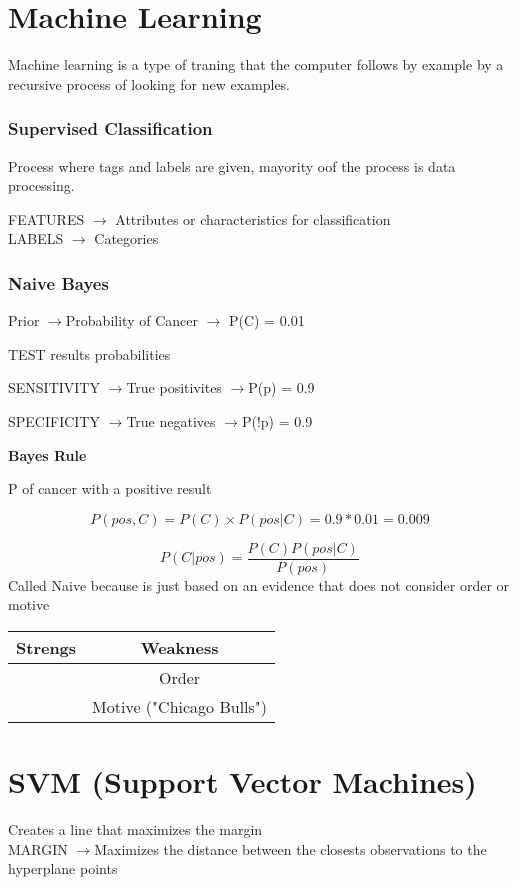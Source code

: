 \documentclass{article}
\newcommand{\ra}{$\longrightarrow$}
\begin{document}
\section{Machine Learning} %
\label{sec:Machine Learning}
Machine learning is a type of traning that the computer follows by example by a
recursive process of looking for new examples.
\subsubsection{Supervised Classification } %
\label{ssub:Supervised Classification }
Process where tags and labels are given, mayority oof the process is data
processing.

FEATURES $\longrightarrow$ Attributes or characteristics for classification\\
LABELS $\longrightarrow$ Categories

\subsubsection{Naive Bayes}


Prior \ra Probability of Cancer $\longrightarrow$ P(C) = 0.01 

TEST results probabilities  

SENSITIVITY \ra True positivites \ra P(p) = 0.9

SPECIFICITY \ra True negatives \ra P(!p) = 0.9

\vspace{1cm}
\textbf{Bayes Rule}

P of cancer with a positive result

$$P(pos,C) = P(C) \times P(pos|C) = 0.9*0.01 =0.009$$

$$P(C|pos) = \frac{P(C)P(pos|C)}{P(pos)}$$
Called Naive because is just based on an evidence that does
not consider order or motive
\begin{table}[h]
\begin{center}
  \begin{tabular}{c|c}
    Strengs & Weakness \\
            \hline
            & Order\\
            & Motive ("Chicago Bulls")

  \end{tabular}
\end{center}
\end{table}

\section{SVM (Support Vector Machines)}
Creates a line that maximizes the margin \\
MARGIN \ra Maximizes the distance between the closests
observations to the hyperplane
points 
\end{document}
